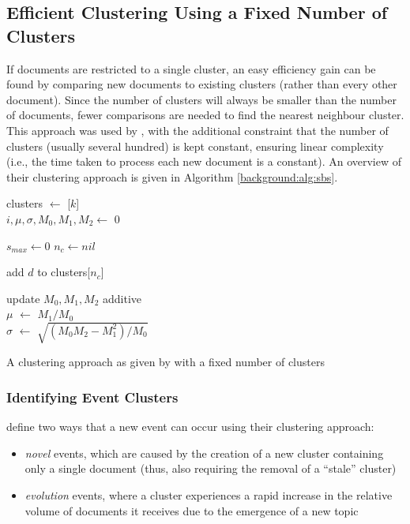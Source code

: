 \subsection{Efficient Clustering Using a Fixed Number of Clusters}
\label{background:cs}
If documents are restricted to a single cluster, an easy efficiency gain can be found by comparing new documents to existing clusters (rather than every other document).
Since the number of clusters will always be smaller than the number of documents, fewer comparisons are needed to find the nearest neighbour cluster.
This approach was used by \cite{Aggarwal12}, with the additional constraint that the number of clusters (usually several hundred) is kept constant, ensuring linear complexity (i.e., the time taken to process each new document is a constant).
An overview of their clustering approach is given in Algorithm \ref{background:alg:sbs}.

\begin{algorithm}
	\DontPrintSemicolon
	clusters $\gets$ [$k$] \\
	$i, \mu, \sigma, M_0, M_1, M_2 \gets$ 0 \\

	 {
		$s_{max} \gets 0$ 
		$n_{c} \gets nil$ 

		 {
			add $d$ to clusters[$n_c$]
		}

	update $M_0, M_1, M_2$ additive \\
	$\mu$ $\gets$ $M_1/M_0$ \\
	$\sigma$ $\gets$ $\sqrt{(M_0M_2 - M_1^2) / M_0}$

	}
	\caption{A clustering approach as given by \cite{Aggarwal12} with a fixed number of clusters}
	\label{background:alg:sbs}
\end{algorithm}

\subsubsection{Identifying Event Clusters}
\cite{Aggarwal12} define two ways that a new event can occur using their clustering approach:
\begin{itemize}
	\item \emph{novel} events, which are caused by the creation of a new cluster containing only a single document (thus, also requiring the removal of a ``stale'' cluster)
	\item \emph{evolution} events, where a cluster experiences a rapid increase in the relative volume of documents it receives due to the emergence of a new topic
\end{itemize}

